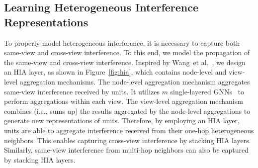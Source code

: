 \documentclass[runningheads]{llncs}
\newcommand{\etal}{{et al.}}
\begin{document}


\subsection{Learning Heterogeneous Interference Representations}\label{interference}


To properly model heterogeneous interference, it is necessary to capture both same-view and cross-view interference.  To this end, we model the propagation of the same-view and cross-view interference. 
Inspired by Wang~\etal~\cite{wang2019heterogeneous}, we design an HIA layer, as shown in Figure~\ref{fig:hia}, which contains node-level and view-level aggregation mechanisms.
The node-level aggregation mechanism aggregates same-view interference received by units. It utilizes $m$ single-layered GNNs~\cite{kipf2016semi,vel2018graph} to perform aggregations within each view. The view-level aggregation mechanism combines (i.e., sums up) the results aggregated by the node-level aggregations to generate new representations of units. 
Therefore, by employing an HIA layer, units are able to aggregate interference received from their one-hop heterogeneous neighbors. This enables capturing cross-view interference by stacking HIA layers. Similarly, same-view interference from multi-hop neighbors can also be captured by stacking HIA layers.
\end{document}
